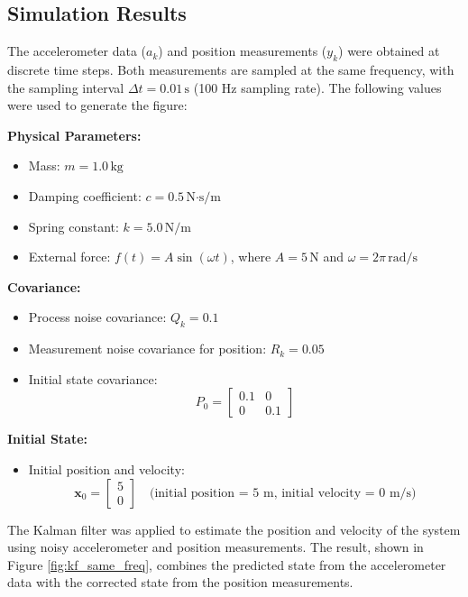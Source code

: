 \subsection{Simulation Results}

The accelerometer data (\( a_k \)) and position measurements (\( y_k \)) 
were obtained at discrete time steps. Both measurements are sampled at the 
same frequency, with the sampling interval \( \Delta t = 0.01 \, \text{s} \) 
(100 Hz sampling rate). The following values were used to generate the figure:

\textbf{Physical Parameters:}
\begin{itemize}
    \item Mass: \( m = 1.0 \, \text{kg} \)
    \item Damping coefficient: \( c = 0.5 \, \text{N·s/m} \)
    \item Spring constant: \( k = 5.0 \, \text{N/m} \)
    \item External force: \( f(t) = A \sin(\omega t) \), where 
    \( A = 5 \, \text{N} \) and \( \omega = 2\pi \, \text{rad/s} \)
\end{itemize}

\textbf{Covariance:}
\begin{itemize}
    \item Process noise covariance: \( Q_k = 0.1 \)
    \item Measurement noise covariance for position: \( R_k = 0.05 \)
    \item Initial state covariance: 
    \[
    P_0 =
    \begin{bmatrix}
    0.1 & 0 \\
    0 & 0.1
    \end{bmatrix}
    \]
\end{itemize}

\textbf{Initial State:}
\begin{itemize}
    \item Initial position and velocity: 
    \[
    \mathbf{x}_0 = \begin{bmatrix} 5 \\ 0 \end{bmatrix} \quad \text{(initial position = 5 m, initial velocity = 0 m/s)}
    \]
\end{itemize}

The Kalman filter was applied to estimate the position and velocity  
of the system using noisy accelerometer and position measurements.  
The result, shown in Figure \ref{fig:kf_same_freq}, combines the  
predicted state from the accelerometer data with the corrected state  
from the position measurements.

